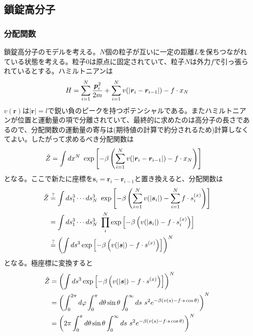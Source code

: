 \documentclass{jsarticle}  %
\numberwithin{equation}{section} %
\numberwithin{figure}{section}
\begin{document}
\subsection{鎖錠高分子}
\subsubsection{分配関数}
    鎖錠高分子のモデルを考える。$N$個の粒子が互いに一定の距離$L$を保ちつながれている状態を考える。粒子$0$は原点に固定されていて、粒子$N$は外力$f$で引っ張られているとする。ハミルトニアンは
    \begin{align}
        H = \sum_{i=1}^N \frac{\bm{p}^2_i}{2m} + \sum_{i=1}^N v(|\bm{r}_i - \bm{r}_{i-1}|) - f \cdot x_N \notag 
    \end{align}
    $v(\bm{r})$は$|\bm{r}|=l$で鋭い負のピークを持つポテンシャルである。またハミルトニアンが位置と運動量の項で分離されていて、最終的に求めたのは高分子の長さであるので、分配関数の運動量の寄与は(期待値の計算で約分されるため)計算しなくてよい。したがって求めるべき分配関数は
    \begin{align}
        \tilde{Z} &= \int dx^N\ \exp \left[ -\beta \left( \sum_{i=1}^N v(|\bm{r}_i - \bm{r}_{i-1}|) - f \cdot x_N \right) \right] \notag 
    \end{align}
    となる。ここで新たに座標を$\bm{s}_i = \bm{r}_i - \bm{r}_{i-1}$と置き換えると、分配関数は
    \begin{align}
        \tilde{Z} &\overset{?}{=} \int ds_1^3 \cdots ds^3_N\  \exp \left[ -\beta \left( \sum_{i=1}^N v(|\bm{s}_i|) - \sum_{i=1}^Nf \cdot s^{(x)}_{i} \right) \right] \notag \\
        &= \int ds_1^3 \cdots ds^3_N\  \prod_i^N \exp \left[ -\beta \left( v(|\bm{s}_i|) - f \cdot s^{(x)}_{i} \right) \right] \notag \\ 
        &\overset{?}{=} \left( \int ds^3 \exp \left[ -\beta \left( v(|\bm{s}|) - f \cdot s^{(x)} \right) \right] \right)^N \notag 
    \end{align}
    となる。極座標に変換すると
    \begin{align}
        \tilde{Z} &= \left( \int ds^3 \exp \left[ -\beta \left( v(|\bm{s}|) - f \cdot s^{(x)} \right) \right] \right)^N \notag \\
        &= \left( \int_0^{2\pi} d\varphi \int_0^{\pi} d\theta \sin \theta \int_0^{\infty} ds\ s^2 e^{-\beta \left( v(s) - f \cdot s\cos \theta \right)} \right)^N \notag \\
        &= \left( 2\pi \int_0^{\pi} d\theta \sin \theta \int_0^{\infty} ds\ s^2e^{-\beta \left( v(s) - f \cdot s\cos \theta \right)} \right)^N \notag 
    \end{align}
\end{document}
